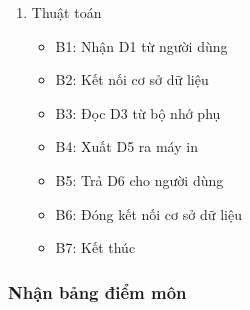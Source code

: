 \documentclass[a4paper]{article}
\begin{document}
\begin{enumerate}[label=\alph*.]
\item Thuật toán
\begin{itemize}
\item B1: Nhận D1 từ người dùng
\item B2: Kết nối cơ sở dữ liệu
\item B3: Đọc D3 từ bộ nhớ phụ
\item B4: Xuất D5 ra máy in
\item B5: Trả D6 cho người dùng
\item B6: Đóng kết nối cơ sở dữ liệu
\item B7: Kết thúc
\end{itemize}


\end{enumerate}	
	
	\subsubsection{Nhận bảng điểm môn}	
\end{document}
